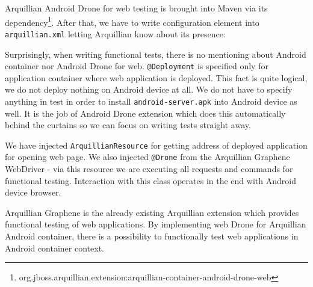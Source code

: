 \documentclass[12pt,final,oneside]{fithesis}
\begin{document}
Arquillian Android Drone for web testing is brought into Maven via its dependency\footnote{org.jboss.arquillian.extension:arquillian-container-android-drone-web}. After that, we have to write configuration element into \texttt{arquillian.xml} letting Arquillian know about its presence: 



Surprisingly, when writing functional tests, there is no mentioning about Android container nor Android Drone for web. \texttt{@Deployment} is specified only for application container where web application is deployed. This fact is quite logical, we do not deploy nothing on Android device at all. We do not have to specify anything in test in order to install \texttt{android-server.apk} into Android device as well. It is the job of Android Drone extension which does this automatically behind the curtains so we can focus on writing tests straight away.

We have injected \texttt{ArquillianResource} for getting address of deployed application for opening web page. We also injected \texttt{@Drone} from the Arquillian Graphene WebDriver - via this resource we are executing all requests and commands for functional testing. Interaction with this class operates in the end with Android device browser.

Arquillian Graphene is the already existing Arquillian extension which provides functional testing of web applications. By implementing web Drone for Arquillian Android container, there is a possibility to functionally test web applications in Android container context.


\end{document}
